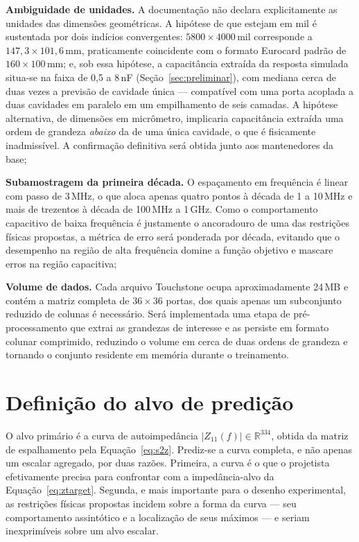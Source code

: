 \begin{alineas}
\item \textbf{Ambiguidade de unidades.} A documentação não declara
explicitamente as unidades das dimensões geométricas. A hipótese de que estejam
em mil é sustentada por dois indícios convergentes: $5800 \times 4000$\,mil
corresponde a $147{,}3 \times 101{,}6$\,mm, praticamente coincidente com o
formato Eurocard padrão de $160 \times 100$\,mm; e, sob essa hipótese, a
capacitância extraída da resposta simulada situa-se na faixa de 0{,}5 a 8\,nF
(Seção~\ref{sec:preliminar}), com mediana cerca de duas vezes a previsão de
cavidade única — compatível com uma porta acoplada a duas cavidades em paralelo
em um empilhamento de seis camadas. A hipótese alternativa, de dimensões em
micrômetro, implicaria capacitância extraída uma ordem de grandeza \emph{abaixo}
da de uma única cavidade, o que é fisicamente inadmissível. A confirmação
definitiva será obtida junto aos mantenedores da base;

\item \textbf{Subamostragem da primeira década.} O espaçamento em frequência é
linear com passo de 3\,MHz, o que aloca apenas quatro pontos à década de 1 a
10\,MHz e mais de trezentos à década de 100\,MHz a 1\,GHz. Como o comportamento
capacitivo de baixa frequência é justamente o ancoradouro de uma das restrições
físicas propostas, a métrica de erro será ponderada por década, evitando que o
desempenho na região de alta frequência domine a função objetivo e mascare erros
na região capacitiva;

\item \textbf{Volume de dados.} Cada arquivo Touchstone ocupa aproximadamente
24\,MB e contém a matriz completa de $36 \times 36$ portas, dos quais apenas um
subconjunto reduzido de colunas é necessário. Será implementada uma etapa de
pré-processamento que extrai as grandezas de interesse e as persiste em formato
colunar comprimido, reduzindo o volume em cerca de duas ordens de grandeza e
tornando o conjunto residente em memória durante o treinamento.
\end{alineas}

\section{Definição do alvo de predição}
\label{sec:alvo}

O alvo primário é a curva de autoimpedância $|Z_{11}(f)| \in \mathbb{R}^{334}$,
obtida da matriz de espalhamento pela Equação~\ref{eq:s2z}. Prediz-se a curva
completa, e não apenas um escalar agregado, por duas razões. Primeira, a curva é
o que o projetista efetivamente precisa para confrontar com a impedância-alvo da
Equação~\ref{eq:ztarget}. Segunda, e mais importante para o desenho experimental,
as restrições físicas propostas incidem sobre a forma da curva — seu
comportamento assintótico e a localização de seus máximos — e seriam inexprimíveis
sobre um alvo escalar.

